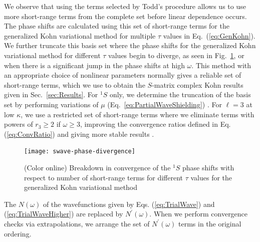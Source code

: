 \documentclass[preprint,showpacs,showkeys,preprintnumbers,amsmath,amssymb,longbibliography,pra,aps]{revtex4-1}
\begin{document}
{We observe that using the terms selected by Todd's procedure allows us to
use more short-range terms from the complete set before linear dependence occurs.
The phase shifts are calculated using this set of short-range terms for the 
generalized Kohn variational method for multiple $\tau$ values in
Eq.~(\ref{eq:GenKohn}). We further truncate this basis set where the phase
shifts for the generalized Kohn variational method
for different $\tau$ values begin to diverge, as seen in
Fig.~\ref{fig:swave-phase-divergence}, or when there is a significant jump in
the phase shifts at high $\omega$. This method with an appropriate choice of
nonlinear parameters normally gives a reliable set of
short-range terms, which we use to obtain the $S$-matrix complex Kohn
results given in Sec.~\ref{sec:Results}. For $^1S$ only, we determine
the truncation of the basis set by performing variations of $\mu$
(Eq.~\ref{eq:PartialWaveShielding}) \cite{WoodsDiss2015}.
For $\ell = 3$ at low $\kappa$, we use a restricted set of short-range terms
where we eliminate terms with powers of $r_3 \geq 2$ if $\omega \geq 3$,
improving the convergence ratios defined in Eq. (\ref{eq:ConvRatio})
and giving more stable results
\cite{VanReeth2003,WoodsDiss2015}.
\begin{figure}[H]
	\centering
	\texttt{[image: swave-phase-divergence]}
	\caption{(Color online) Breakdown in convergence of the $^1S$ phase
shifts with respect to number of short-range terms for different $\tau$
values for the generalized Kohn variational method}
	\label{fig:swave-phase-divergence}
\end{figure}

The $N(\omega)$ of the wavefunctions given by Eqs. (\ref{eq:TrialWave}) and
(\ref{eq:TrialWaveHigher}) are replaced by $N^\prime(\omega)$.
When we perform convergence checks via extrapolations, we
arrange the set of $N^\prime(\omega)$ terms in the original ordering.

}
\end{document}
